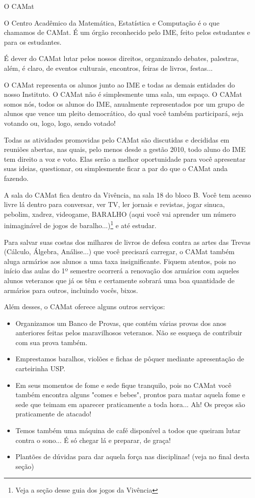 \begin{secao}{O CAMat}

O Centro Acadêmico da Matemática, Estatística e Computação é o que chamamos de
CAMat. É um órgão reconhecido pelo IME, feito pelos estudantes e para os
estudantes.

É dever do CAMat lutar pelos nossos direitos, organizando debates, palestras,
além, é claro, de eventos culturais, encontros, feiras de livros, festas...

O CAMat representa os alunos junto ao IME e todas as demais entidades do nosso
Instituto. O CAMat não é simplesmente uma sala, um espaço. O CAMat somos nós,
todos os alunos do IME, anualmente representados por um grupo de alunos que
vence um pleito democrático, do qual você também participará, seja votando ou,
logo, logo, sendo votado!

Todas as atividades promovidas pelo CAMat são discutidas e decididas em
reuniões abertas, nas quais, pelo menos desde a gestão 2010, todo aluno do IME tem
direito a voz e voto. Elas serão a melhor oportunidade para você apresentar suas
ideias, questionar, ou simplesmente ficar a par do que o CAMat
anda fazendo.

A sala do CAMat  fica dentro da Vivência, na sala 18 do bloco B. Você tem acesso
livre lá dentro para conversar, ver TV, ler jornais e revistas, jogar sinuca,
pebolim, xadrez, videogame, BARALHO (aqui você vai aprender um número inimaginável de
jogos de baralho...)\footnote{Veja a seção desse guia dos jogos da
Vivência} e até estudar.

Para salvar suas costas dos milhares de livros de defesa contra as artes das
Trevas (Cálculo, Álgebra, Análise...) que você precisará carregar, o CAMat
também aluga armários aos alunos a uma taxa insignificante. Fiquem atentos, pois no
início das aulas do 1º semestre ocorrerá a renovação dos armários com
aqueles alunos veteranos que já os têm e certamente sobrará uma boa quantidade
de armários para outros, incluindo vocês, bixos.

Além desses, o CAMat oferece alguns outros serviços:

\begin{itemize}
  \item Organizamos um Banco de Provas, que contém várias provas dos anos
    anteriores feitas pelos maravilhosos veteranos. Não se esqueça de contribuir
    com sua prova também.
  \item Emprestamos baralhos, violões e fichas de pôquer mediante apresentação
    de carteirinha USP.
  \item Em seus momentos de fome e sede fique tranquilo, pois no CAMat você
    também encontra alguns "comes e bebes", prontos para matar aquela fome e
    sede que teimam em aparecer praticamente a toda hora... Ah! Os preços são
    praticamente de atacado!
  \item Temos também uma máquina de café disponível a todos que queiram lutar
    contra o sono... É só chegar lá e preparar, de graça!
  \item Plantões de dúvidas para dar aquela força nas disciplinas! (veja no
    final desta seção)
\end{itemize}


\end{secao}
